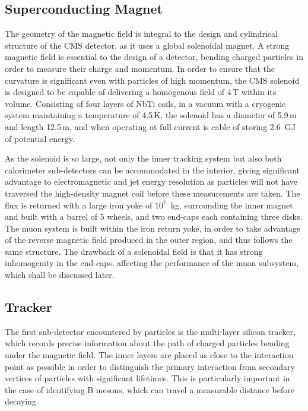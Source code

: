\subsection{Superconducting Magnet}

The geometry of the magnetic field is integral to the design and cylindrical structure of the CMS detector, as it uses a global solenoidal magnet. A strong magnetic field is essential to the design of a detector, bending charged particles in order to measure their charge and momentum. In order to ensure that the curvature is significant even with particles of high momentum, the CMS solenoid is designed to be capable of delivering a homogenous field of 4\,T within its volume. Consisting of four layers of NbTi coils, in a vacuum with a cryogenic system maintaining a temperature of 4.5\,K, the solenoid has a diameter of 5.9\,m and length 12.5\,m, and when operating at full current is cable of storing 2.6~GJ of potential energy.

As the solenoid is so large, not only the inner tracking system but also both calorimeter sub-detectors can be accommodated in the interior, giving significant advantage to electromagnetic and jet energy resolution as particles will not have traversed the high-density magnet coil before these measurements are taken. The flux is returned with a large iron yoke of $10^{7}$~kg, surrounding the inner magnet and built with a barrel of 5 wheels, and two end-caps each containing three disks. The muon system is built within the iron return yoke, in order to take advantage of the reverse magnetic field produced in the outer region, and thus follows the same structure. The drawback of a solenoidal field is that it has strong inhomogenity in the end-caps, affecting the performance of the muon subsystem, which shall be discussed later.


\subsection{Tracker}



The first sub-detector encountered by particles is the multi-layer silicon tracker, which records precise information about the path of charged particles bending under the magnetic field. The inner layers are placed as close to the interaction point as possible in order to distinguish the primary interaction from secondary vertices of particles with significant lifetimes. This is particularly important in the case of identifying B mesons, which can travel a measurable distance before decaying.  

